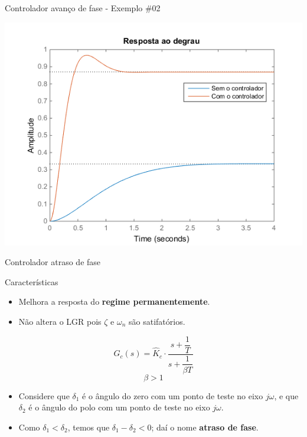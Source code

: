 \begin{frame}{Controlador avanço de fase - Exemplo \#02}
\centerline{\includegraphics[width=0.8\linewidth]{Figuras/Ch09/fig10.png}}
\end{frame}

\begin{frame}{Controlador atraso de fase}
\begin{block}{Características}
\begin{itemize}
	\item Melhora a resposta do \textbf{regime permanentemente}.
	\item Não altera o LGR pois $\zeta$ e $\omega_n$ são satifatórios.
\end{itemize}

\begin{minipage}{0.45\linewidth}
	\centering
	
	\scalebox{1}{}
\end{minipage}
\hfill
\begin{minipage}{0.5\linewidth}
\[ G_c(s)=\hat{K}_c\cdot\dfrac{s+\dfrac{1}{T}}{s+\dfrac{1}{\beta T}} \]
$$\beta > 1$$
\end{minipage}
\vspace{0.1cm}
\begin{itemize}
	\item Considere que $\delta_1$ é o ângulo do zero com um ponto de teste no eixo $j\omega$, e que $\delta_2$ é o ângulo do polo com um ponto de teste no eixo $j\omega$.
	\item Como $\delta_1 < \delta_2$, temos que $\delta_1 - \delta_2 < 0$; daí o nome \textbf{atraso de fase}.
\end{itemize}
\end{block}
\end{frame}


